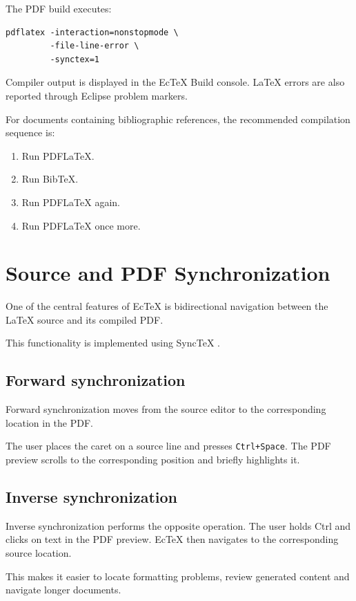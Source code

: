 \documentclass[11pt,a4paper]{article}
\begin{document}
The PDF build executes:

\begin{lstlisting}
pdflatex -interaction=nonstopmode \
         -file-line-error \
         -synctex=1
\end{lstlisting}

Compiler output is displayed in the EcTeX Build console.
LaTeX errors are also reported through Eclipse problem
markers.

For documents containing bibliographic references,
the recommended compilation sequence is:

\begin{enumerate}[noitemsep]
    \item Run PDFLaTeX.
    \item Run BibTeX.
    \item Run PDFLaTeX again.
    \item Run PDFLaTeX once more.
\end{enumerate}

\section{Source and PDF Synchronization}

One of the central features of EcTeX is bidirectional
navigation between the LaTeX source and its compiled PDF.

This functionality is implemented using SyncTeX
\cite{synctex}.

\subsection{Forward synchronization}

Forward synchronization moves from the source editor
to the corresponding location in the PDF.

The user places the caret on a source line and presses
\texttt{Ctrl+Space}. The PDF preview scrolls to the
corresponding position and briefly highlights it.

\subsection{Inverse synchronization}

Inverse synchronization performs the opposite operation.
The user holds Ctrl and clicks on text in the PDF preview.
EcTeX then navigates to the corresponding source location.

This makes it easier to locate formatting problems,
review generated content and navigate longer documents.
\end{document}
